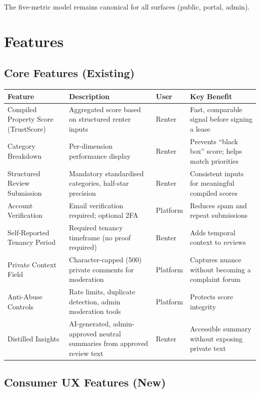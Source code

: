 \documentclass[11pt,letterpaper]{article}
\begin{document}
The five-metric model remains canonical for all surfaces (public, portal, admin).

\section{Features}

\subsection{Core Features (Existing)}

\begin{longtable}{p{3.5cm} p{4cm} p{2cm} p{4cm}}
\toprule
\textbf{Feature} & \textbf{Description} & \textbf{User} & \textbf{Key Benefit} \\
\midrule
\endhead
Compiled Property Score (TrustScore) &
Aggregated score based on structured renter inputs &
Renter &
Fast, comparable signal before signing a lease \\
\addlinespace
Category Breakdown &
Per-dimension performance display &
Renter &
Prevents ``black box'' score; helps match priorities \\
\addlinespace
Structured Review Submission &
Mandatory standardised categories, half-star precision &
Renter &
Consistent inputs for meaningful compiled scores \\
\addlinespace
Account Verification &
Email verification required; optional 2FA &
Platform &
Reduces spam and repeat submissions \\
\addlinespace
Self-Reported Tenancy Period &
Required tenancy timeframe (no proof required) &
Renter &
Adds temporal context to reviews \\
\addlinespace
Private Context Field &
Character-capped (500) private comments for moderation &
Platform &
Captures nuance without becoming a complaint forum \\
\addlinespace
Anti-Abuse Controls &
Rate limits, duplicate detection, admin moderation tools &
Platform &
Protects score integrity \\
\addlinespace
Distilled Insights &
AI-generated, admin-approved neutral summaries from approved review text &
Renter &
Accessible summary without exposing private text \\
\bottomrule
\end{longtable}

\subsection{Consumer UX Features (New)}
\end{document}
